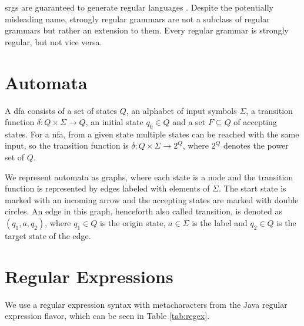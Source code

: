 \Aclp{srg} are guaranteed to generate regular languages \cite{mohri_nederhof}.
Despite the potentially misleading name, strongly regular grammars are not a subclass of regular grammars but rather an extension to them. Every regular grammar is strongly regular, but not vice versa.

\section{Automata}\label{sec:background:automata}

A \acf{dfa} consists of a set of states $Q$, an alphabet of input symbols $\Sigma$, a transition function $\delta: Q \times \Sigma \rightarrow Q$, an initial state $q_0 \in Q$ and a set $F \subseteq Q$ of accepting states.
For a \acf{nfa}, from a given state multiple states can be reached with the same input, so the transition function is  $\delta: Q \times \Sigma \rightarrow 2^Q$, where $2^Q$ denotes the power set of $Q$.

We represent automata as graphs, where each state is a node and the transition function is represented by edges labeled with elements of $\Sigma$. The start state is marked with an incoming arrow and the accepting states are marked with double circles.
An edge in this graph, henceforth also called transition, is denoted as $(q_1, a, q_2)$, where $q_1 \in Q$ is the origin state, $a \in \Sigma$ is the label and $q_2 \in Q$ is the target state of the edge.

\newpage
\section{Regular Expressions}\label{sec:background:regex}

We use a regular expression syntax with metacharacters from the Java regular expression flavor, which can be seen in Table \ref{tab:regex}.

